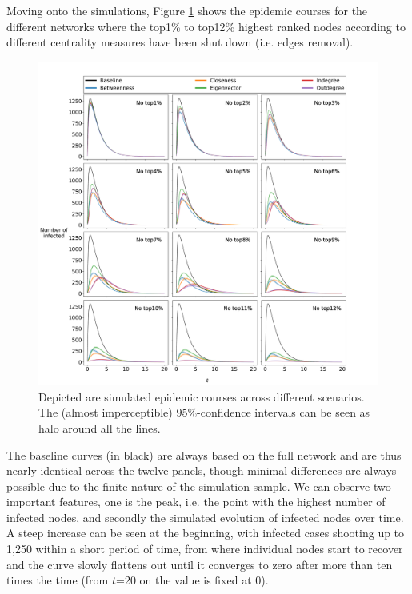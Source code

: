 Moving onto the simulations, Figure \ref{fig:epidemic_course} shows the epidemic courses for the different networks where the top1\% to top12\% highest ranked nodes according to different centrality measures have been shut down (i.e. edges removal).
\begin{figure}[!h]
    \centering
    \includegraphics[width=\linewidth]{Figures/epidemic_course.pdf}
    \caption{Depicted are simulated epidemic courses across different scenarios. The (almost imperceptible) 95\%-confidence intervals can be seen as halo around all the lines.}
    \label{fig:epidemic_course}
\end{figure}
The baseline curves (in black) are always based on the full network and are thus nearly identical across the twelve panels, though minimal differences are always possible due to the finite nature of the simulation sample. We can observe two important features, one is the peak, i.e. the point with the highest number of infected nodes, and secondly the simulated evolution of infected nodes over time. A steep increase can be seen at the beginning, with infected cases shooting up to 1,250 within a short period of time, from where individual nodes start to recover and the curve slowly flattens out until it converges to zero after more than ten times the time (from $t$=20 on the value is fixed at 0). 

